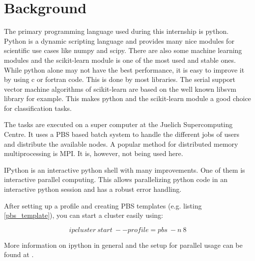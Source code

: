 
\section{Background}

The primary programming language used during this internship is python.
Python is a dynamic scripting language and provides many nice modules
for scientific use cases like numpy and scipy. There are also some
machine learning modules and the scikit-learn module \cite{sklearn}
is one of the most used and stable ones. While python alone may not
have the best performance, it is easy to improve it by using c or
fortran code. This is done by most libraries. The serial support vector
machine algorithms of scikit-learn are based on the well known libsvm
library for example. This makes python and the scikit-learn module
a good choice for classification tasks. 

The tasks are executed on a super computer at the Juelich Supercomputing
Centre. It uses a PBS based batch system to handle the different jobs
of users and distribute the available nodes. A popular method for
distributed memory multiprocessing is MPI. It is, however, not being
used here.

IPython is an interactive python shell with many improvements. One
of them is interactive parallel computing. This allows parallelizing
python code in an interactive python session and has a robust error
handling. 



After setting up a profile and creating PBS templates (e.g. listing
\ref{pbs_template}), you can start a cluster easily using:

\[
ipcluster~start~--profile=pbs~-n~8
\]
 

More information on ipython in general and the setup for parallel
usage can be found at \cite{ipython_doc}.
